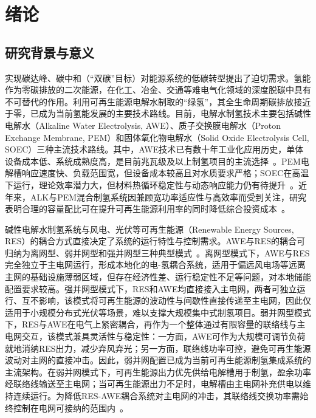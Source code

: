 
\chapter{绪论}

\section{研究背景与意义}

实现碳达峰、碳中和（``双碳''目标）对能源系统的低碳转型提出了迫切需求。氢能作为零碳排放的二次能源，在化工、冶金、交通等难电气化领域的深度脱碳中具有不可替代的作用。利用可再生能源电解水制取的``绿氢''，其全生命周期碳排放接近于零，已成为当前氢能发展的主要技术路线。目前，电解水制氢技术主要包括碱性电解水（Alkaline Water Electrolysis, AWE）、质子交换膜电解水（Proton Exchange Membrane, PEM）和固体氧化物电解水（Solid Oxide Electrolysis Cell, SOEC）三种主流技术路线。其中，AWE技术已有数十年工业化应用历史，单体设备成本低、系统成熟度高，是目前兆瓦级及以上制氢项目的主流选择~\cite{Hu2022AppliedEnergy}。PEM电解槽响应速度快、负载范围宽，但设备成本较高且对水质要求严格；SOEC在高温下运行，理论效率潜力大，但材料热循环稳定性与动态响应能力仍有待提升~\cite{Zhang2025TEC}。近年来，ALK与PEM混合制氢系统因兼顾宽功率适应性与高效率而受到关注，研究表明合理的容量配比可在提升可再生能源利用率的同时降低综合投资成本~\cite{Wang2026APEN}。

碱性电解水制氢系统与风电、光伏等可再生能源（Renewable Energy Sources, RES）的耦合方式直接决定了系统的运行特性与控制需求。AWE与RES的耦合可归纳为离网型、弱并网型和强并网型三种典型模式~\cite{Xia2025TPEL, Zhang2025EPSR}。离网型模式下，AWE与RES完全独立于主电网运行，形成本地化的电-氢耦合系统，适用于偏远风电场等远离主网的基础设施薄弱区域，但存在经济性差、运行稳定性不足等问题，对本地储能配置要求较高。强并网型模式下，RES和AWE均直接接入主电网，两者可独立运行、互不影响，该模式将可再生能源的波动性与间歇性直接传递至主电网，因此仅适用于小规模分布式光伏等场景，难以支撑大规模集中式制氢项目。弱并网型模式下，RES与AWE在电气上紧密耦合，再作为一个整体通过有限容量的联络线与主电网交互，该模式兼具灵活性与稳定性：一方面，AWE可作为大规模可调节负荷就地消纳RES出力，减少弃风弃光；另一方面，联络线功率可控，避免可再生能源波动对主网的直接冲击。因此，弱并网配置已成为当前可再生能源制氢集成系统的主流架构。在弱并网模式下，可再生能源出力优先供给电解槽用于制氢，盈余功率经联络线输送至主电网；当可再生能源出力不足时，电解槽由主电网补充供电以维持连续运行。为降低RES-AWE耦合系统对主电网的冲击，其联络线交换功率需始终控制在电网可接纳的范围内~\cite{Zeng2025TSTE, Survey2024Hydrogen}。

